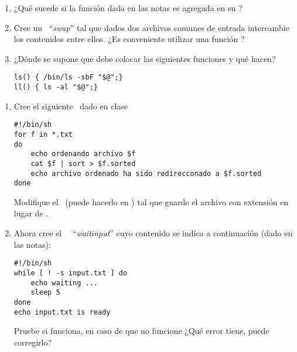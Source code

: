\begin{ejercicio}
\begin{enumerate}
\item ¿Qué sucede si la función  dada en las notas es agregada en su ?
\item Cree un \script~``{\it swap}'' tal que dados dos archivos comunes de entrada intercambie los contenidos entre ellos. ¿Es conveniente utilizar una función ?
\item ¿Dónde se supone que debe colocar las siguientes funciones y qué hacen?
\begin{verbatim}
ls() { /bin/ls -sbF "$@";} 
ll() { ls -al "$@";}
\end{verbatim}

\end{enumerate}
\end{ejercicio}

\pagebreak
\begin{ejercicio}
\begin{enumerate}

\item Cree el siguiente \script~dado en clase
\begin{verbatim}
#!/bin/sh
for f in *.txt
do
    echo ordenando archivo $f
    cat $f | sort > $f.sorted
    echo archivo ordenado ha sido redirecconado a $f.sorted
done
\end{verbatim}

Modifique el \script~(puede hacerlo en ) tal que guarde el archivo con extensión  en lugar de .

\item Ahora cree el \shell~\script~``{\it waitinput}'' cuyo contenido se indica a continuación (dado en las notas):
\begin{verbatim}
#!/bin/sh
while [ ! -s input.txt ] do
    echo waiting ...
    sleep 5
done
echo input.txt is ready
\end{verbatim}

Pruebe si funciona, en caso de que no funcione ¿Qué error tiene, puede corregirlo?
\end{enumerate}
\end{ejercicio}


